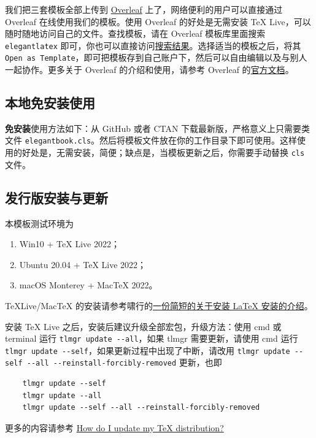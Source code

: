 \documentclass[lang=cn,newtx,10pt,scheme=chinese]{elegantbook}
\begin{document}
我们把三套模板全部上传到 \href{https://www.overleaf.com/}{Overleaf} 上了，网络便利的用户可以直接通过 Overleaf 在线使用我们的模板。使用 Overleaf 的好处是无需安装 \TeX{} Live，可以随时随地访问自己的文件。查找模板，请在 Overleaf 模板库里面搜索 \lstinline{elegantlatex} 即可，你也可以直接访问\href{https://www.overleaf.com/latex/templates?addsearch=elegantlatex}{搜索结果}。选择适当的模板之后，将其 \lstinline{Open as Template}，即可把模板存到自己账户下，然后可以自由编辑以及与别人一起协作。更多关于 Overleaf 的介绍和使用，请参考 Overleaf 的\href{https://www.overleaf.com/learn}{官方文档}。

\subsection{本地免安装使用}

\textbf{免安装}使用方法如下：从 GitHub 或者 CTAN 下载最新版，严格意义上只需要类文件 \lstinline{elegantbook.cls}。然后将模板文件放在你的工作目录下即可使用。这样使用的好处是，无需安装，简便；缺点是，当模板更新之后，你需要手动替换 \lstinline{cls} 文件。

\subsection{发行版安装与更新}

本模板测试环境为 
\begin{enumerate}
	\item Win10 + \TeX{} Live 2022；
	\item Ubuntu 20.04 + \TeX{} Live 2022；
	\item macOS Monterey + Mac\TeX{} 2022。
\end{enumerate}

\TeX Live/Mac\TeX{} 的安装请参考啸行的\href{https://github.com/OsbertWang/install-latex-guide-zh-cn/releases/}{一份简短的关于安装 \LaTeX{} 安装的介绍}。

安装 \TeX{} Live 之后，安装后建议升级全部宏包，升级方法：使用 cmd 或 terminal 运行 \lstinline{tlmgr update --all}，如果 tlmgr 需要更新，请使用 cmd 运行 \lstinline{tlmgr update --self}，如果更新过程中出现了中断，请改用 \lstinline{tlmgr update --self --all --reinstall-forcibly-removed} 更新，也即

\begin{lstlisting}
	tlmgr update --self 
	tlmgr update --all
	tlmgr update --self --all --reinstall-forcibly-removed
\end{lstlisting}

更多的内容请参考 \href{https://tex.stackexchange.com/questions/55437/how-do-i-update-my-tex-distribution}{How do I update my \TeX{} distribution?}
\end{document}
